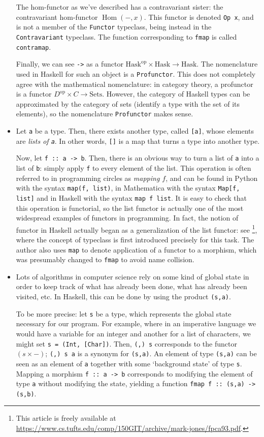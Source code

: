 \documentclass[11pt]{article}
\theoremstyle{nonumberplain}
\newcommand{\Hask}{\mathrm{Hask}}
\newcommand{\cat}[1]{\mathrm{#1}}
\newcommand{\blank}{{-}}
\newcommand{\op}{\mathrm{op}}
\DeclareMathOperator{\Hom}{Hom}
\newcommand*\lsin{\lstinline}
\begin{document}
\begin{itemize}
The hom-functor as we've described has a contravariant sister: the contravariant hom-functor $\Hom(\blank, x)$. This functor is denoted \lsin|Op x|, and is not a member of the \lsin|Functor| typeclass, being instead in the \lsin|Contravariant| typeclass. The function corresponding to \lsin|fmap| is called \lsin|contramap|.

Finally, we can see \lsin|->| as a functor $\Hask^\op \times \Hask \to \Hask$. The nomenclature used in Haskell for such an object is a \lsin|Profunctor|. This does not completely agree with the mathematical nomenclature: in category theory, a profunctor is a functor $D^\op \times C \to \cat{Sets}$. However, the category of Haskell types can be approximated by the category of sets (identify a type with the set of its elements), so the nomenclature \lsin|Profunctor| makes sense.

\item Let \lsin|a| be a type. Then, there exists another type, called \lsin|[a]|, whose elements are \emph{lists of \lsin|a|}. In other words, \lsin|[]| is a map that turns a type into another type.

Now, let \lsin|f :: a -> b|. Then, there is an obvious way to turn a list of \lsin|a| into a list of \lsin|b|: simply apply \lsin|f| to every element of the list. This operation is often referred to in programming circles as \emph{mapping $f$}, and can be found in Python with the syntax \lsin|map(f, list)|, in Mathematica with the syntax \lsin|Map[f, list]| and in Haskell with the syntax \lsin|map f list|. It is easy to check that this operation is functorial, so the list functor is actually one of the most widespread examples of functors in programming. In fact, the notion of functor in Haskell actually began as a generalization of the list functor: see \cite{markjones}\footnote{This article is freely available at \url{https://www.cs.tufts.edu/comp/150GIT/archive/mark-jones/fpca93.pdf}.}, where the concept of typeclass is first introduced precisely for this task. The author also uses \lsin|map| to denote application of a functor to a morphism, which was presumably changed to \lsin|fmap| to avoid name collision.

\item Lots of algorithms in computer science rely on some kind of global state in order to keep track of what has already been done, what has already been visited, etc. In Haskell, this can be done by using the product \lsin|(s,a)|.

To be more precise: let \lsin|s| be a type, which represents the global state necessary for our program. For example, where in an imperative language we would have a variable for an integer and another for a list of characters, we might set \lsin|s = (Int, [Char])|. Then, \lsin|(,) s| corresponds to the functor $(s \times \blank)$; \lsin|(,) s a| is a synonym for \lsin|(s,a)|. An element of type \lsin|(s,a)| can be seen as an element of \lsin|a| together with some `background state' of type \lsin|s|. Mapping a morphism \lsin|f :: a -> b| corresponds to modifying the element of type \lsin|a| without modifying the state, yielding a function \lsin|fmap f :: (s,a) -> (s,b)|.
\end{itemize}
\end{document}
